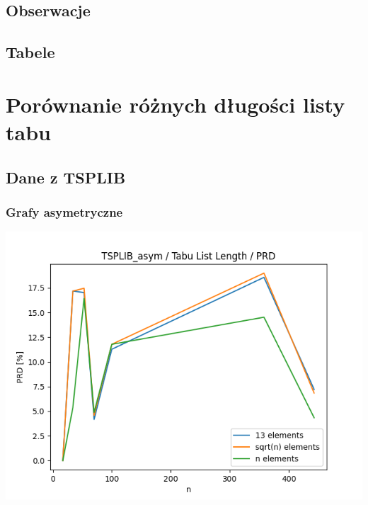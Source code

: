 \documentclass{article}
\begin{document}
\subsection{Obserwacje}

\subsection{Tabele}



\section{Porównanie różnych długości listy tabu}

\subsection{Dane z TSPLIB}

\subsubsection{Grafy asymetryczne}

\begin{center}
\includegraphics[width=\textwidth, 
                   height = 0.4\textheight, 
                   keepaspectratio]
                  {plots/tabu_tsplib_asym_prd} 
\end{center}
\end{document}
